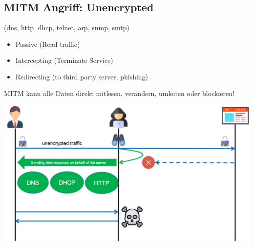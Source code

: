 \subsection{MITM Angriff: Unencrypted}\label{subsec:unencrypted-mitm-attack}
(dns, http, dhcp, telnet, arp, snmp, smtp)
\begin{itemize}
    \item Passive (Read traffic)
    \item Intercepting (Terminate Service)
    \item Redirecting (to third party server, phishing)
\end{itemize}
MITM kann alle Daten direkt mitlesen, verändern, umleiten oder blockieren!
\begin{center}
    \vspace{-8pt}
    \includegraphics[width=1.0\linewidth]{./img/09-mitm/mitm_unenctypt_2}
    \vspace{-8pt}
\end{center}

